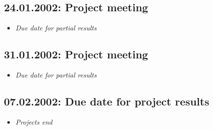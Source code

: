 \subsection*{24.01.2002: Project meeting}
%
\begin{itemize}
\item{\em Due date for partial results}
\end{itemize}
%
\subsection*{31.01.2002: Project meeting}
%
\begin{itemize}
\item{\em Due date for partial results}
\end{itemize}
%
\subsection*{07.02.2002: Due date for project results}
%
\begin{itemize}
\item{\em Projects end}
\end{itemize}
%
\newslide
